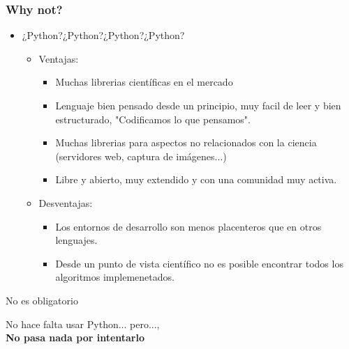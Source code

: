 \documentclass[10pt,colorlinks]{beamer}
\begin{document}
\begin{frame}[fragile]\frametitle{Why not?}
 \begin{itemize}
    \item ¿Python?¿Python?¿Python?¿Python?
        \begin{itemize}
            \item Ventajas:
                \begin{itemize}
                     \item \tiny Muchas librerias científicas en el mercado
                    \item \tiny Lenguaje bien pensado desde un principio, muy facil de leer y bien estructurado, "Codificamos lo que pensamos".
                    \item \tiny Muchas librerias para aspectos no relacionados con la ciencia (servidores web, captura de imágenes...)
                    \item \tiny Libre y abierto, muy extendido y con una comunidad muy activa.
                \end{itemize}
            \item Desventajas:
                \begin{itemize}
                    \item \tiny Los entornos de desarrollo son menos placenteros que en otros lenguajes.
                    \item \tiny Desde un punto de vista científico no es posible encontrar todos los algoritmos implemenetados. 
                \end{itemize}
        \end{itemize}
\end{itemize}
\begin{block}{\begin{center}
    No es obligatorio
\end{center}}
\begin{center}
No hace falta usar Python... pero...,\\ \textbf{No pasa nada por intentarlo}\end{center}
\end{block}


\end{frame}
\end{document}
